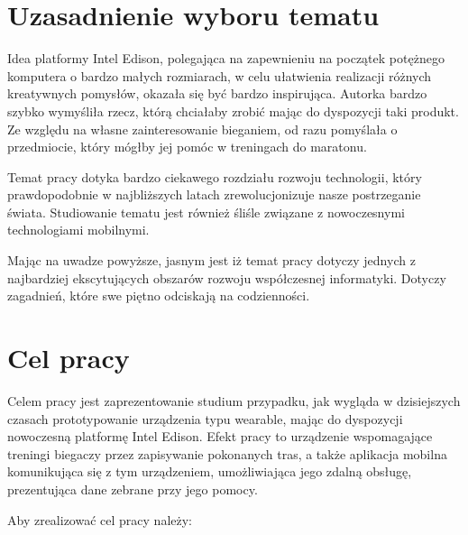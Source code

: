 \documentclass[a4paper,twoside,titlepage,openright]{book}
\begin{document}
\section*{Uzasadnienie wyboru tematu}

Idea platformy Intel Edison, polegająca na zapewnieniu na początek potężnego komputera o bardzo małych rozmiarach, w celu ułatwienia realizacji różnych kreatywnych pomysłów, okazała się być bardzo inspirująca. Autorka bardzo szybko wymyśliła rzecz, którą chciałaby zrobić mając do dyspozycji taki produkt. Ze względu na własne zainteresowanie bieganiem, od razu pomyślała o przedmiocie, który mógłby jej pomóc w treningach do maratonu.

Temat pracy dotyka bardzo ciekawego rozdziału rozwoju technologii, który prawdopodobnie w najbliższych latach zrewolucjonizuje nasze postrzeganie świata. Studiowanie tematu jest również śliśle związane z nowoczesnymi technologiami mobilnymi. 

Mając na uwadze powyższe, jasnym jest iż temat pracy dotyczy jednych z najbardziej ekscytujących obszarów rozwoju współczesnej informatyki. Dotyczy zagadnień, które swe piętno odciskają na codzienności.

\section*{Cel pracy}

Celem pracy jest zaprezentowanie studium przypadku, jak wygląda w dzisiejszych czasach prototypowanie urządzenia typu wearable, mając do dyspozycji nowoczesną platformę Intel Edison. 
Efekt pracy to urządzenie wspomagające treningi biegaczy przez zapisywanie pokonanych tras, a także aplikacja mobilna komunikująca się z tym urządzeniem, umożliwiająca jego zdalną obsługę, prezentująca dane zebrane przy jego pomocy.

Aby zrealizować cel pracy należy:
\end{document}
